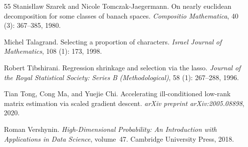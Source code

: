 \documentclass[11pt]{article}
\begin{document}
\begin{thebibliography}{55}
Stanis{\l}law Szarek and Nicole Tomczak-Jaegermann.
\newblock On nearly euclidean decomposition for some classes of banach spaces.
\newblock \emph{Compositio Mathematica}, 40 (3): 367--385,
  1980.

Michel Talagrand.
\newblock Selecting a proportion of characters.
\newblock \emph{Israel Journal of Mathematics}, 108 (1): 173,
  1998.

Robert Tibshirani.
\newblock Regression shrinkage and selection via the lasso.
\newblock \emph{Journal of the Royal Statistical Society: Series B
  (Methodological)}, 58 (1): 267--288, 1996.

Tian Tong, Cong Ma, and Yuejie Chi.
\newblock Accelerating ill-conditioned low-rank matrix estimation via scaled
  gradient descent.
\newblock \emph{arXiv preprint arXiv:2005.08898}, 2020.

Roman Vershynin.
\newblock \emph{High-Dimensional Probability: An Introduction with Applications
  in Data Science}, volume~47.
\newblock Cambridge University Press, 2018.

\end{thebibliography}
\end{document}
